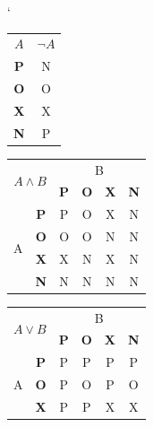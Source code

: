 \documentclass[11pt]{article}
\begin{document}
\begin{table}[h!]
    \centering
    \catcode`
    \begin{tabular}{|c|c|}
    \cline{1-2}
        $A$ & $\neg A$ \\ \cline{1-2}
        \textbf{P} & N \\ \cline{1-2}
        \textbf{O} & O \\ \cline{1-2}
        \textbf{X} & X \\ \cline{1-2}
        \textbf{N} & P \\ \cline{1-2}
    \end{tabular}
    \begin{tabular}{|c|c|c|c|c|c|}
        \hline
        \multicolumn{2}{|c|}{\multirow{2}{*}{{$A \wedge B$}}} & \multicolumn{4}{c|}{B}                            \\ \cline{3-6} 
        \multicolumn{2}{|c|}{}                              & \textbf{P} & \textbf{O} & \textbf{X} & \textbf{N} \\ \hline
        \multirow{4}{*}{A}           & \textbf{P}           & P          & O          & X          & N          \\ \cline{2-6} 
                                     & \textbf{O}           & O          & O          & N          & N          \\ \cline{2-6} 
                                     & \textbf{X}           & X          & N          & X          & N          \\ \cline{2-6} 
                                     & \textbf{N}           & N          & N          & N          & N          \\ \hline
    \end{tabular}
    \begin{tabular}{|c|c|c|c|c|c|}
        \hline
        \multicolumn{2}{|c|}{\multirow{2}{*}{$A \vee B$}} & \multicolumn{4}{c|}{B}                            \\ \cline{3-6} 
        \multicolumn{2}{|c|}{}                      & \textbf{P} & \textbf{O} & \textbf{X} & \textbf{N} \\ \hline
        \multirow{4}{*}{A}       & \textbf{P}       & P          & P          & P          & P          \\ \cline{2-6} 
                                    & \textbf{O}       & P          & O          & P          & O          \\ \cline{2-6} 
                                    & \textbf{X}       & P          & P          & X          & X          \\ \cline{2-6} 

\end{tabular}
\end{table}
\end{document}
